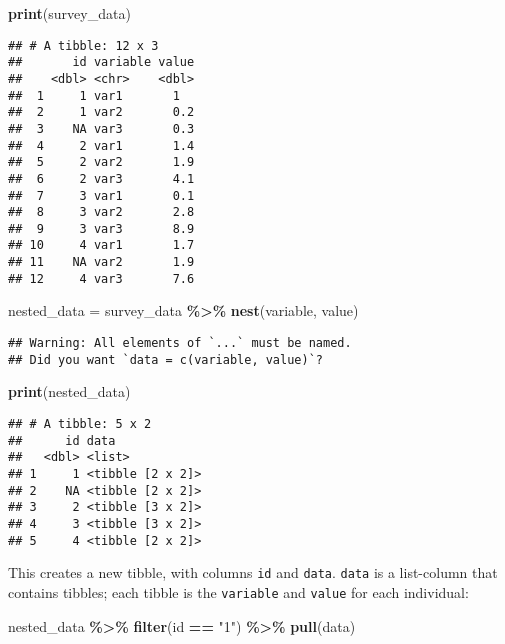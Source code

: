 \documentclass[
]{article}
\newenvironment{Shaded}{\begin{snugshade}}{\end{snugshade}}
\newcommand{\KeywordTok}[1]{\textcolor[rgb]{0.13,0.29,0.53}{\textbf{#1}}}
\newcommand{\NormalTok}[1]{#1}
\newcommand{\OperatorTok}[1]{\textcolor[rgb]{0.81,0.36,0.00}{\textbf{#1}}}
\newcommand{\StringTok}[1]{\textcolor[rgb]{0.31,0.60,0.02}{#1}}
\begin{document}
\begin{Shaded}
\begin{Highlighting}[]
\KeywordTok{print}\NormalTok{(survey\_data)}
\end{Highlighting}
\end{Shaded}

\begin{verbatim}
## # A tibble: 12 x 3
##       id variable value
##    <dbl> <chr>    <dbl>
##  1     1 var1       1  
##  2     1 var2       0.2
##  3    NA var3       0.3
##  4     2 var1       1.4
##  5     2 var2       1.9
##  6     2 var3       4.1
##  7     3 var1       0.1
##  8     3 var2       2.8
##  9     3 var3       8.9
## 10     4 var1       1.7
## 11    NA var2       1.9
## 12     4 var3       7.6
\end{verbatim}

\begin{Shaded}
\begin{Highlighting}[]
\NormalTok{nested\_data =}\StringTok{ }\NormalTok{survey\_data }\OperatorTok{\%\textgreater{}\%}
\StringTok{  }\KeywordTok{nest}\NormalTok{(variable, value)}
\end{Highlighting}
\end{Shaded}

\begin{verbatim}
## Warning: All elements of `...` must be named.
## Did you want `data = c(variable, value)`?
\end{verbatim}

\begin{Shaded}
\begin{Highlighting}[]
\KeywordTok{print}\NormalTok{(nested\_data)}
\end{Highlighting}
\end{Shaded}

\begin{verbatim}
## # A tibble: 5 x 2
##      id data            
##   <dbl> <list>          
## 1     1 <tibble [2 x 2]>
## 2    NA <tibble [2 x 2]>
## 3     2 <tibble [3 x 2]>
## 4     3 <tibble [3 x 2]>
## 5     4 <tibble [2 x 2]>
\end{verbatim}

This creates a new tibble, with columns \texttt{id} and \texttt{data}. \texttt{data} is a list-column that contains
tibbles; each tibble is the \texttt{variable} and \texttt{value} for each individual:

\begin{Shaded}
\begin{Highlighting}[]
\NormalTok{nested\_data }\OperatorTok{\%\textgreater{}\%}
\StringTok{  }\KeywordTok{filter}\NormalTok{(id }\OperatorTok{==}\StringTok{ "1"}\NormalTok{) }\OperatorTok{\%\textgreater{}\%}
\StringTok{  }\KeywordTok{pull}\NormalTok{(data)}
\end{Highlighting}
\end{Shaded}
\end{document}
